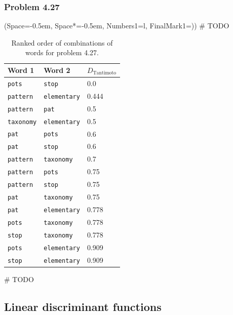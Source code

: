 \documentclass[12pt, a4paper]{article}
\newcommand{\listSpace}{-0.5em}%
\begin{document}
\subsubsection*{Problem 4.27}
\begin{easylist}[enumerate]
\ListProperties(Space=\listSpace, Space*=\listSpace, Numbers1=l, FinalMark1={)})
# TODO

\begin{table}[ht!]
	\centering
	\caption{Ranked order of combinations of words for problem 4.27.}
	\begin{tabular}{@{}lll@{}} \toprule
	Word 1	& Word 2 & $D_\text{Tantimoto}$ \\ \midrule
	\texttt{pots} & \texttt{stop} &  0.0 \\ 
	\texttt{pattern} & \texttt{elementary} &  0.444 \\ 
	\texttt{pattern} & \texttt{pat} &  0.5 \\ 
	\texttt{taxonomy} & \texttt{elementary} &  0.5 \\ 
	\texttt{pat} & \texttt{pots} &  0.6 \\ 
	\texttt{pat} & \texttt{stop} &  0.6 \\ 
	\texttt{pattern} & \texttt{taxonomy} &  0.7 \\ 
	\texttt{pattern} & \texttt{pots} &  0.75 \\ 
	\texttt{pattern} & \texttt{stop} &  0.75 \\ 
	\texttt{pat} & \texttt{taxonomy} &  0.75 \\ 
	\texttt{pat} & \texttt{elementary} &  0.778 \\ 
	\texttt{pots} & \texttt{taxonomy} &  0.778 \\ 
	\texttt{stop} & \texttt{taxonomy} &  0.778 \\ 
	\texttt{pots} & \texttt{elementary} &  0.909 \\ 
	\texttt{stop} & \texttt{elementary} &  0.909 \\  \bottomrule
	\end{tabular}
	\label{table:problem_4_17}
\end{table}


# TODO
\end{easylist}

\clearpage
\subsection{Linear discriminant functions}
\end{document}
